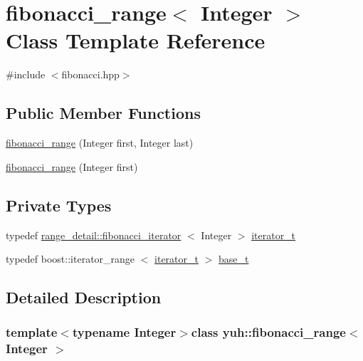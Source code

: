 \hypertarget{classyuh_1_1fibonacci__range}{\section{fibonacci\-\_\-range$<$ \-Integer $>$ \-Class \-Template \-Reference}
\label{db/de6/classyuh_1_1fibonacci__range}
}


{\ttfamily \#include $<$fibonacci.\-hpp$>$}

\subsection*{\-Public \-Member \-Functions}
\begin{DoxyCompactItemize}
\item 
\hyperlink{classyuh_1_1fibonacci__range_ab3a2681e52208de267de23d86976d5e0}{fibonacci\-\_\-range} (\-Integer first, \-Integer last)
\item 
\hyperlink{classyuh_1_1fibonacci__range_aaae77161b33d731f696702b4d23f57ff}{fibonacci\-\_\-range} (\-Integer first)
\end{DoxyCompactItemize}
\subsection*{\-Private \-Types}
\begin{DoxyCompactItemize}
\item 
typedef \*
\hyperlink{classyuh_1_1range__detail_1_1fibonacci__iterator}{range\-\_\-detail\-::fibonacci\-\_\-iterator}\*
$<$ \-Integer $>$ \hyperlink{classyuh_1_1fibonacci__range_a8d8b78b59079e797d7c2e623de6779b9}{iterator\-\_\-t}
\item 
typedef boost\-::iterator\-\_\-range\*
$<$ \hyperlink{classyuh_1_1fibonacci__range_a8d8b78b59079e797d7c2e623de6779b9}{iterator\-\_\-t} $>$ \hyperlink{classyuh_1_1fibonacci__range_a9d51b0fc63206906184824c5b08403b2}{base\-\_\-t}
\end{DoxyCompactItemize}


\subsection{\-Detailed \-Description}
\subsubsection*{template$<$typename \-Integer$>$class yuh\-::fibonacci\-\_\-range$<$ Integer $>$}

